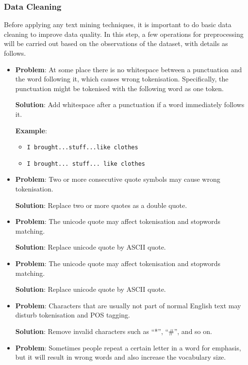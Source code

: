\documentclass[conference]{IEEEtran}
\providecommand{\tightlist}{%
  \setlength{\itemsep}{0pt}\setlength{\parskip}{0pt}
}
\begin{document}
\hypertarget{data-cleaning}{%
\subsubsection{Data Cleaning}\label{data-cleaning}}

Before applying any text mining techniques, it is important to do basic
data cleaning to improve data quality. In this step, a few operations
for preprocessing will be carried out based on the observations of the
dataset, with details as follows.

\begin{itemize}
\item
  \textbf{Problem}: At some place there is no whitespace between a
  punctuation and the word following it, which causes wrong
  tokenisation. Specifically, the punctuation might be tokenised with
  the following word as one token.

  \textbf{Solution}: Add whitespace after a punctuation if a word
  immediately follows it.

  \textbf{Example}:

  \begin{itemize}
  \tightlist
  \item
    \texttt{\footnotesize I brought...stuff...like clothes}
  \item
    \texttt{\footnotesize I brought... stuff... like clothes}
  \end{itemize}
\item
  \textbf{Problem}: Two or more consecutive quote symbols may cause
  wrong tokenisation.

  \textbf{Solution}: Replace two or more quotes as a double quote.
\item
  \textbf{Problem}: The unicode quote may affect tokenisation and
  stopwords matching.

  \textbf{Solution}: Replace unicode quote by ASCII quote.
\item
  \textbf{Problem}: The unicode quote may affect tokenisation and
  stopwords matching.

  \textbf{Solution}: Replace unicode quote by ASCII quote.
\item
  \textbf{Problem}: Characters that are usually not part of normal
  English text may disturb tokenisation and POS tagging.

  \textbf{Solution}: Remove invalid characters such as ``*'', ``\#'',
  and so on.
\item
  \textbf{Problem}: Sometimes people repeat a certain letter in a word
  for emphasis, but it will result in wrong words and also increase the
  vocabulary size.


\end{itemize}
\end{document}
